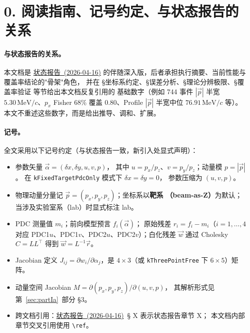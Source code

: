 \documentclass[a4paper, 11pt]{article}
\theoremstyle{plain}
\theoremstyle{definition}
\theoremstyle{remark}
\providecommand{\StatusReport}{\href{rk_reconstruction_status_20260416_zh.pdf}{状态报告~(2026-04-16)}}
\begin{document}
\tableofcontents
\listoffigures
\listoftables
\listofalgorithms
\newpage

\section*{0. 阅读指南、记号约定、与状态报告的关系}

\paragraph{与状态报告的关系。}
本文档是
\StatusReport
的伴随深入版，后者承担执行摘要、当前性能与覆盖率结论的"骨架"角色，
并在 §坐标系约定、§误差分析、§理论分辨极限、§覆盖率验证 等节给出本文档反复引用的
基础数字（例如 744 事件 $|\vec p|$ 半宽 $5.30\,\mathrm{MeV}/c$、$p_x$
Fisher 68\% 覆盖 $0.80$、Profile $|\vec p|$ 半宽中位 $76.91\,\mathrm{MeV}/c$ 等）。
本文不重述这些数字，而是给出推导、调和、扩展。

\paragraph{记号。}
全文采用以下记号约定（与状态报告一致，新引入处显式声明）：
\begin{itemize}[nosep]
  \item 参数矢量 $\vec\alpha = (\delta x, \delta y, u, v, p)$，
        其中 $u = p_x/p_z$、$v = p_y/p_z$；动量模 $p = |\vec p|$。
        在 \texttt{kFixedTargetPdcOnly} 模式下 $\delta x = \delta y = 0$，
        参数压缩为 $(u, v, p)$。
  \item 物理动量分量记 $\vec p = (p_x, p_y, p_z)$；坐标系以\textbf{靶系
        （beam-as-Z）}为默认；当涉及实验室系（lab）时显式标注 lab。
  \item PDC 测量值 $m_i$；前向模型预言 $f_i(\vec\alpha)$；
        原始残差 $r_i = f_i - m_i$（$i = 1, \dots, 4$ 对应
        PDC1$u$、PDC1$v$、PDC2$u$、PDC2$v$）；白化残差 $\vec w$
        通过 Cholesky $C = LL^\top$ 得到 $\vec w = L^{-1}\vec r$。
  \item Jacobian 定义 $J_{ij} = \partial w_i / \partial \alpha_j$，是
        $4\times 3$（或 \texttt{kThreePointFree} 下 $6\times 5$）矩阵。
  \item 动量空间 Jacobian $M = \partial(p_x,p_y,p_z)/\partial(u,v,p)$，
        其解析形式见第~\ref{sec:partIa}~部分 §3。
  \item 跨文档引用：\StatusReport\ § X 表示状态报告章节 X；
        本文档内部章节交叉引用使用 \texttt{\textbackslash{}ref}。
\end{itemize}
\end{document}
